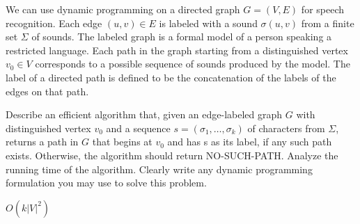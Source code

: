 \newpage
{} %

\problemdes

We can use dynamic programming on a directed graph $G = (V,E)$ for speech recognition. Each edge $(u, v) \in E$ is labeled with a sound $\sigma(u, v)$ from a finite set $\Sigma$ of sounds. The labeled graph is a formal model of a person speaking a restricted language. Each path in the graph starting from a distinguished vertex $v_0 \in V$ corresponds to a possible sequence of sounds produced by the model. The label of a directed path is defined to be the concatenation of the labels of the edges on that path.

Describe an efficient algorithm that, given an edge-labeled graph $G$ with distinguished vertex $v_0$ and a sequence $s = (\sigma_1, \dots, \sigma_k)$ of characters from $\Sigma$, returns a path in $G$ that begins at $v_0$ and has s as its label, if any such path exists. Otherwise, the algorithm should return NO-SUCH-PATH. Analyze the running time of the algorithm. Clearly write any dynamic programming formulation you may use to solve this problem.

\solution











$O(k |V|^2)$




